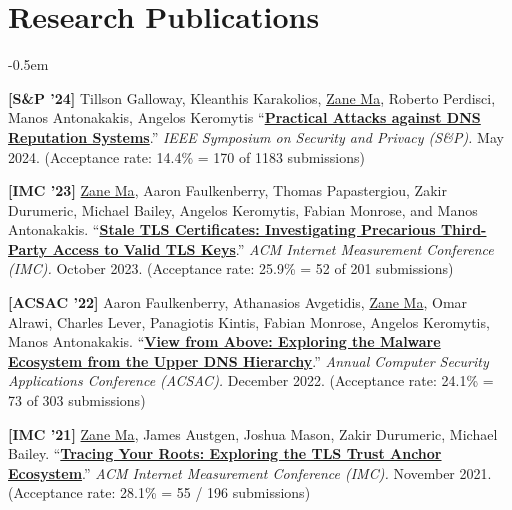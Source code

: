 \documentclass[10pt,singlecolumn]{article} %
\begin{document}

\section{Research Publications} 

\begin{etaremune}
\itemsep -0.5em 

\item \textbf{[S\&P '24]} 
Tillson Galloway, Kleanthis Karakolios, \underline{Zane Ma}, Roberto Perdisci, Manos Antonakakis, Angelos Keromytis
``\textbf{\href{}{Practical Attacks against DNS Reputation Systems}}.''
\emph{IEEE Symposium on Security and Privacy (S\&P).} May 2024.
(Acceptance rate: 14.4\% = 170 of 1183 submissions)
\vspace{6pt}


\item \textbf{[IMC '23]} 
\underline{Zane Ma}, Aaron Faulkenberry, Thomas Papastergiou, Zakir Durumeric, Michael Bailey, Angelos Keromytis, Fabian Monrose, and Manos Antonakakis.
``\textbf{\href{https://zanema.com/papers/imc23_stale_certs.pdf}{Stale TLS Certificates: Investigating Precarious Third-Party Access to Valid TLS Keys}}.''
\emph{ACM Internet Measurement Conference (IMC).} October 2023.
(Acceptance rate: 25.9\% = 52 of 201 submissions)
\vspace{6pt}


\item \textbf{[ACSAC '22]} 
Aaron Faulkenberry, Athanasios Avgetidis, \underline{Zane Ma}, Omar Alrawi, Charles Lever, Panagiotis Kintis, Fabian Monrose, Angelos Keromytis, Manos Antonakakis.
``\textbf{\href{https://zanema.com/papers/acsac22_authdns.pdf}{View from Above: Exploring the Malware Ecosystem from the Upper DNS Hierarchy}}.''
\emph{Annual Computer Security Applications Conference (ACSAC).} December 2022.
(Acceptance rate: 24.1\% = 73 of 303 submissions)
\vspace{6pt}



\item \textbf{[IMC '21]} 
\underline{Zane Ma}, James Austgen, Joshua Mason, Zakir Durumeric, Michael Bailey.
``\textbf{\href{https://zanema.com/papers/imc21_roots.pdf}{Tracing Your Roots: Exploring the TLS Trust Anchor Ecosystem}}.''
\emph{ACM Internet Measurement Conference (IMC).} November 2021.
(Acceptance rate: 28.1\% = 55 / 196 submissions)
\vspace{6pt}


\end{etaremune}
\end{document}
